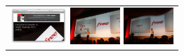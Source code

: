 \documentclass{acm_proc_article-sp}
\newcommand{\thumbheight}{14mm}
\newenvironment{thumbsequence}{}{\makebox[4mm]{}}
\begin{document}
\begin{figure}
\begin{tabular}{p{\textwidth}}
\begin{thumbsequence}
		\includegraphics[height=\thumbheight]{resources/free/looseduplicate16.png}
	\end{thumbsequence}
	\begin{thumbsequence}
		\includegraphics[height=\thumbheight]{resources/free/looseduplicate9.jpg}
		\includegraphics[height=\thumbheight]{resources/free/looseduplicate10.jpg}

\end{thumbsequence}
\end{tabular}
\end{figure}
\end{document}
